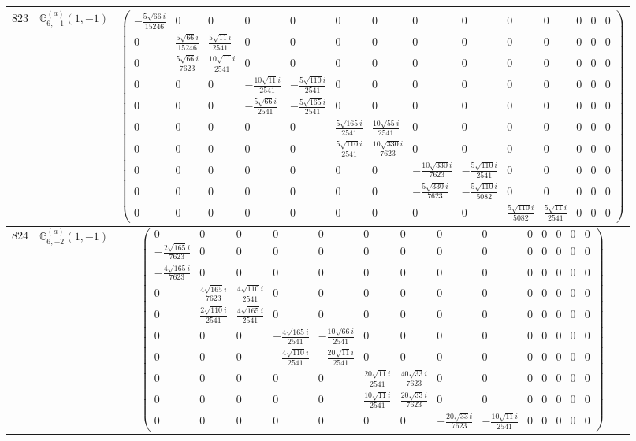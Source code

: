 \documentclass[fleqn,8pt,landscape]{jsarticle}
\begin{document}
\begin{center}
\begin{longtable}{ccc}
$ 823 $ & $ \mathbb{G}_{6,-1}^{(a)}(1,-1) $ & $ \begin{pmatrix} - \frac{5 \sqrt{66} i}{15246} & 0 & 0 & 0 & 0 & 0 & 0 & 0 & 0 & 0 & 0 & 0 & 0 & 0 \\ 0 & \frac{5 \sqrt{66} i}{15246} & \frac{5 \sqrt{11} i}{2541} & 0 & 0 & 0 & 0 & 0 & 0 & 0 & 0 & 0 & 0 & 0 \\ 0 & \frac{5 \sqrt{66} i}{7623} & \frac{10 \sqrt{11} i}{2541} & 0 & 0 & 0 & 0 & 0 & 0 & 0 & 0 & 0 & 0 & 0 \\ 0 & 0 & 0 & - \frac{10 \sqrt{11} i}{2541} & - \frac{5 \sqrt{110} i}{2541} & 0 & 0 & 0 & 0 & 0 & 0 & 0 & 0 & 0 \\ 0 & 0 & 0 & - \frac{5 \sqrt{66} i}{2541} & - \frac{5 \sqrt{165} i}{2541} & 0 & 0 & 0 & 0 & 0 & 0 & 0 & 0 & 0 \\ 0 & 0 & 0 & 0 & 0 & \frac{5 \sqrt{165} i}{2541} & \frac{10 \sqrt{55} i}{2541} & 0 & 0 & 0 & 0 & 0 & 0 & 0 \\ 0 & 0 & 0 & 0 & 0 & \frac{5 \sqrt{110} i}{2541} & \frac{10 \sqrt{330} i}{7623} & 0 & 0 & 0 & 0 & 0 & 0 & 0 \\ 0 & 0 & 0 & 0 & 0 & 0 & 0 & - \frac{10 \sqrt{330} i}{7623} & - \frac{5 \sqrt{110} i}{2541} & 0 & 0 & 0 & 0 & 0 \\ 0 & 0 & 0 & 0 & 0 & 0 & 0 & - \frac{5 \sqrt{330} i}{7623} & - \frac{5 \sqrt{110} i}{5082} & 0 & 0 & 0 & 0 & 0 \\ 0 & 0 & 0 & 0 & 0 & 0 & 0 & 0 & 0 & \frac{5 \sqrt{110} i}{5082} & \frac{5 \sqrt{11} i}{2541} & 0 & 0 & 0 \end{pmatrix} $ \\ \hline
$ 824 $ & $ \mathbb{G}_{6,-2}^{(a)}(1,-1) $ & $ \begin{pmatrix} 0 & 0 & 0 & 0 & 0 & 0 & 0 & 0 & 0 & 0 & 0 & 0 & 0 & 0 \\ - \frac{2 \sqrt{165} i}{7623} & 0 & 0 & 0 & 0 & 0 & 0 & 0 & 0 & 0 & 0 & 0 & 0 & 0 \\ - \frac{4 \sqrt{165} i}{7623} & 0 & 0 & 0 & 0 & 0 & 0 & 0 & 0 & 0 & 0 & 0 & 0 & 0 \\ 0 & \frac{4 \sqrt{165} i}{7623} & \frac{4 \sqrt{110} i}{2541} & 0 & 0 & 0 & 0 & 0 & 0 & 0 & 0 & 0 & 0 & 0 \\ 0 & \frac{2 \sqrt{110} i}{2541} & \frac{4 \sqrt{165} i}{2541} & 0 & 0 & 0 & 0 & 0 & 0 & 0 & 0 & 0 & 0 & 0 \\ 0 & 0 & 0 & - \frac{4 \sqrt{165} i}{2541} & - \frac{10 \sqrt{66} i}{2541} & 0 & 0 & 0 & 0 & 0 & 0 & 0 & 0 & 0 \\ 0 & 0 & 0 & - \frac{4 \sqrt{110} i}{2541} & - \frac{20 \sqrt{11} i}{2541} & 0 & 0 & 0 & 0 & 0 & 0 & 0 & 0 & 0 \\ 0 & 0 & 0 & 0 & 0 & \frac{20 \sqrt{11} i}{2541} & \frac{40 \sqrt{33} i}{7623} & 0 & 0 & 0 & 0 & 0 & 0 & 0 \\ 0 & 0 & 0 & 0 & 0 & \frac{10 \sqrt{11} i}{2541} & \frac{20 \sqrt{33} i}{7623} & 0 & 0 & 0 & 0 & 0 & 0 & 0 \\ 0 & 0 & 0 & 0 & 0 & 0 & 0 & - \frac{20 \sqrt{33} i}{7623} & - \frac{10 \sqrt{11} i}{2541} & 0 & 0 & 0 & 0 & 0 \end{pmatrix} $ \\ \hline

\end{longtable}
\end{center}
\end{document}
